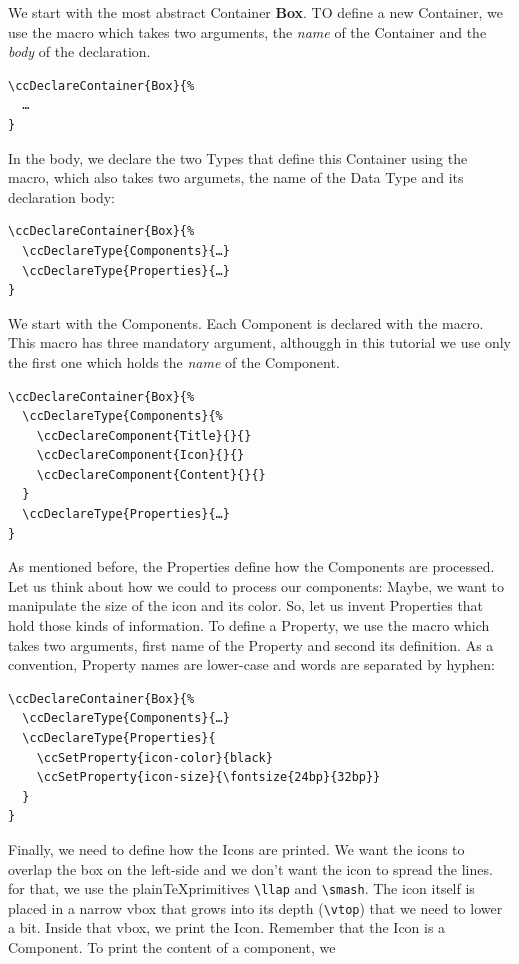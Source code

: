 We start with the most abstract Container \textbf{Box}. TO define a
new Container, we use the \UsageMacro{\ccDeclareContainer} macro which
takes two arguments, the \textit{name} of the Container and the
\textit{body} of the declaration.
\begin{lstlisting}
\ccDeclareContainer{Box}{%
  …
}
\end{lstlisting}
In the body, we declare the two Types that define this Container using
the \UsageMacro{\ccDeclareType} macro, which also takes two argumets, the name of the Data Type and its declaration body:
\begin{lstlisting}
\ccDeclareContainer{Box}{%
  \ccDeclareType{Components}{…}
  \ccDeclareType{Properties}{…}
}
\end{lstlisting}
We start with the Components. Each Component is declared with the
\UsageMacro{\ccDeclareComponent} macro. This macro has three mandatory
argument, althouggh in this tutorial we use only the first one which
holds the \textit{name} of the Component.
\begin{lstlisting}
\ccDeclareContainer{Box}{%
  \ccDeclareType{Components}{%
    \ccDeclareComponent{Title}{}{}
    \ccDeclareComponent{Icon}{}{}
    \ccDeclareComponent{Content}{}{}
  }
  \ccDeclareType{Properties}{…}
}
\end{lstlisting}
As mentioned before, the Properties define how the Components are
processed. Let us think about how we could to process our components:
Maybe, we want to manipulate the size of the icon and its color. So,
let us invent Properties that hold those kinds of information. To
define a Property, we use the macro \UsageMacro{\ccSetProperty} which
takes two arguments, first name of the Property and second its
definition. As a convention, Property names are lower-case and words
are separated by hyphen:
\begin{lstlisting}
\ccDeclareContainer{Box}{%
  \ccDeclareType{Components}{…}
  \ccDeclareType{Properties}{
    \ccSetProperty{icon-color}{black}
    \ccSetProperty{icon-size}{\fontsize{24bp}{32bp}}
  }
}
\end{lstlisting}
Finally, we need to define how the Icons are printed. We want the
icons to overlap the box on the left-side and we don't want the icon
to spread the lines. for that, we use the plain\TeX primitives
\lstinline{\llap} and \lstinline{\smash}. The icon itself is placed in
a narrow vbox that grows into its depth (\lstinline{\vtop}) that we
need to lower a bit. Inside that vbox, we print the Icon. Remember
that the Icon is a Component. To print the content of a component, we
